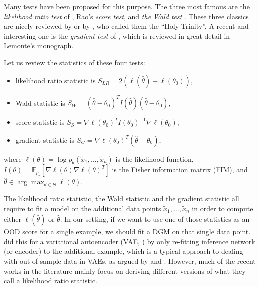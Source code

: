 {Many tests have been proposed for this purpose. The three most famous are the \emph{likelihood ratio test} of \textcite{neyman_use_1928}, Rao's \citeyearpar{rao_large_1948} \emph{score test},
and \emph{the Wald test} \parencite{wald_tests_1943}. These three classics are nicely reviewed by \textcite{buse_likelihood_1982} or by \textcite{rao_score_2005}, who called them the ``Holy Trinity''. A recent and interesting one is the \emph{gradient test} of \textcite{terrell_gradient_2002}, which is reviewed in great detail in Lemonte's \citeyearpar{lemonte_gradient_2016} monograph.

Let us review the statistics of these four tests:
\begin{itemize}
    \item likelihood ratio statistic is $S_{LR} = 2 ( \ell ( \hat{\theta}) -\ell ( \theta_0))$,
    \item Wald statistic is $S_{W} = (\hat{\theta} - \theta_0)^T I(\hat{\theta}) (\hat{\theta} - \theta_0)$,
    \item score statistic is $S_{S} = \nabla \ell ( \theta_0)^T I(\theta_0)^{-1}  \nabla \ell ( \theta_0)$,
    \item gradient statistic is $S_{G} = \nabla \ell ( \theta_0)^T (\hat{\theta} - \theta_0)$,
\end{itemize}
where $ \ell ( \theta) = \log p_\theta (\tilde{x}_1,\ldots,\tilde{x}_n)$ is the likelihood function, 
$I({\theta}) = \mathbb{E}_{p_\theta}[\nabla \ell ( \theta)\nabla \ell ( \theta)^T]$ is the Fisher information matrix (FIM), and $ \hat{\theta} \in \arg\max_{\theta \in \Theta} \ell ( \theta)$.

The likelihood ratio statistic, the Wald statistic and the gradient statistic all require to fit a model on the additional data points $\tilde{x}_1,\ldots,\tilde{x}_n$ in order to compute either $\ell(\hat{\theta})$ or $\hat{\theta}$. 
%
In our setting, if we want to use one of those statistics as an OOD score for a single example, we should fit a DGM on that single data point. \textcite{xiao_likelihood_2020} did this for a variational autoencoder (VAE, \citealp{kingma_autoencoding_2014,rezende_stochastic_2014}) by only re-fitting inference network (or encoder) to the additional example, which is a typical approach to dealing with out-of-sample data in VAEs, as argued by \textcite{cremer_inference_2018} and \textcite{mattei_refit_2018}.
However, much of the recent works in the literature \parencite{ren_likelihood_2019, schirrmeister_understanding_2020, serra_input_2020} mainly focus on deriving different versions of what they call a likelihood ratio statistic.

}
